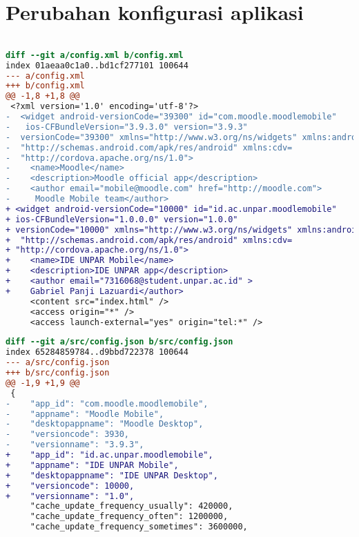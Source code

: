 \chapter{Perubahan konfigurasi aplikasi}
\label{lamp:A}

%
%
%


\begin{lstlisting}[language=diff, frame=single, label ={set:config:xml}, caption = Perubahan pada file \texttt{config.xml} ]

diff --git a/config.xml b/config.xml
index 01aeaa0c1a0..bd1cf277101 100644
--- a/config.xml
+++ b/config.xml
@@ -1,8 +1,8 @@
 <?xml version='1.0' encoding='utf-8'?>
-  <widget android-versionCode="39300" id="com.moodle.moodlemobile" 
-   ios-CFBundleVersion="3.9.3.0" version="3.9.3" 
-  versionCode="39300" xmlns="http://www.w3.org/ns/widgets" xmlns:android=
-  "http://schemas.android.com/apk/res/android" xmlns:cdv= 
-  "http://cordova.apache.org/ns/1.0">
-    <name>Moodle</name>
-    <description>Moodle official app</description>
-    <author email="mobile@moodle.com" href="http://moodle.com">
-     Moodle Mobile team</author>
+ <widget android-versionCode="10000" id="id.ac.unpar.moodlemobile" 
+ ios-CFBundleVersion="1.0.0.0" version="1.0.0" 
+ versionCode="10000" xmlns="http://www.w3.org/ns/widgets" xmlns:android=
+  "http://schemas.android.com/apk/res/android" xmlns:cdv=
+ "http://cordova.apache.org/ns/1.0">
+    <name>IDE UNPAR Mobile</name>
+    <description>IDE UNPAR app</description>
+    <author email="7316068@student.unpar.ac.id" >
+    Gabriel Panji Lazuardi</author>
     <content src="index.html" />
     <access origin="*" />
     <access launch-external="yes" origin="tel:*" />
\end{lstlisting} 

\begin{lstlisting}[language=diff, frame=single, label ={set:src:config:json}, caption = Perubahan pada file \texttt{src/config.json} ]
diff --git a/src/config.json b/src/config.json
index 65284859784..d9bbd722378 100644
--- a/src/config.json
+++ b/src/config.json
@@ -1,9 +1,9 @@
 {
-    "app_id": "com.moodle.moodlemobile",
-    "appname": "Moodle Mobile",
-    "desktopappname": "Moodle Desktop",
-    "versioncode": 3930,
-    "versionname": "3.9.3",
+    "app_id": "id.ac.unpar.moodlemobile",
+    "appname": "IDE UNPAR Mobile",
+    "desktopappname": "IDE UNPAR Desktop",
+    "versioncode": 10000,
+    "versionname": "1.0",
     "cache_update_frequency_usually": 420000,
     "cache_update_frequency_often": 1200000,
     "cache_update_frequency_sometimes": 3600000,
\end{lstlisting}



